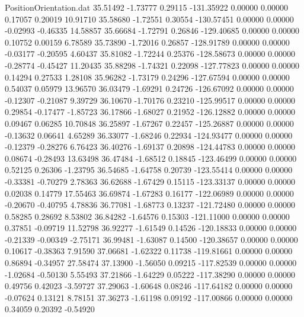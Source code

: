 \begin{filecontents}{PositionOrientation.dat}
  35.51492   -1.73777    0.29115  -131.35922    0.00000    0.00000    0.17057    0.20019   10.91710
  35.58680   -1.72551    0.30554  -130.57451    0.00000    0.00000   -0.02993   -0.46335   14.58857
  35.66684   -1.72791    0.26846  -129.40685    0.00000    0.00000    0.10752    0.00159    6.78589
  35.73890   -1.72016    0.26857  -128.91789    0.00000    0.00000   -0.03177   -0.20595    4.60437
  35.81082   -1.72244    0.25376  -128.58673    0.00000    0.00000   -0.28774   -0.45427   11.20435
  35.88298   -1.74321    0.22098  -127.77823    0.00000    0.00000    0.14294    0.27533    1.28108
  35.96282   -1.73179    0.24296  -127.67594    0.00000    0.00000    0.54037    0.05979   13.96570
  36.03479   -1.69291    0.24726  -126.67092    0.00000    0.00000   -0.12307   -0.21087    9.39729
  36.10670   -1.70176    0.23210  -125.99517    0.00000    0.00000    0.29854   -0.17477   -1.85723
  36.17866   -1.68027    0.21952  -126.12882    0.00000    0.00000    0.09467    0.06285   10.70848
  36.25897   -1.67267    0.22457  -125.26887    0.00000    0.00000   -0.13632    0.06641    4.65289
  36.33077   -1.68246    0.22934  -124.93477    0.00000    0.00000   -0.12379   -0.28276    6.76423
  36.40276   -1.69137    0.20898  -124.44783    0.00000    0.00000    0.08674   -0.28493   13.63498
  36.47484   -1.68512    0.18845  -123.46499    0.00000    0.00000    0.52125    0.26306   -1.23795
  36.54685   -1.64758    0.20739  -123.55414    0.00000    0.00000   -0.33381   -0.70279    2.78363
  36.62688   -1.67429    0.15115  -123.33137    0.00000    0.00000    0.02038    0.14779   17.55463
  36.69874   -1.67283    0.16177  -122.06989    0.00000    0.00000   -0.20670   -0.40795    4.78836
  36.77081   -1.68773    0.13237  -121.72480    0.00000    0.00000    0.58285    0.28692    8.53802
  36.84282   -1.64576    0.15303  -121.11000    0.00000    0.00000    0.37851   -0.09719   11.52798
  36.92277   -1.61549    0.14526  -120.18833    0.00000    0.00000   -0.21339   -0.00349   -2.75171
  36.99481   -1.63087    0.14500  -120.38657    0.00000    0.00000    0.10617   -0.38363    7.91590
  37.06681   -1.62322    0.11738  -119.81661    0.00000    0.00000    0.86894   -0.34957   27.58474
  37.13900   -1.56050    0.09215  -117.82539    0.00000    0.00000   -1.02684   -0.50130    5.55493
  37.21866   -1.64229    0.05222  -117.38290    0.00000    0.00000    0.49756    0.42023   -3.59727
  37.29063   -1.60648    0.08246  -117.64182    0.00000    0.00000   -0.07624    0.13121    8.78151
  37.36273   -1.61198    0.09192  -117.00866    0.00000    0.00000    0.34059    0.20392   -0.54920

\end{filecontents}
